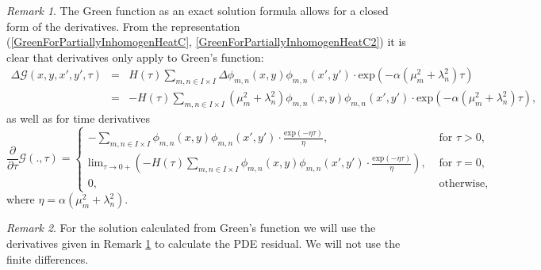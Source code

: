 \documentclass[a4paper,11pt]{article}
\theoremstyle{plain} %
\theoremstyle{definition} %
\theoremstyle{remark} %
\newtheorem{remark}{Remark}[section]
\theoremstyle{remark}
\def\Laplace{\Delta}
\def\Green{\mathscr{G}}
\begin{document}
\begin{remark} \label{Green_derivatives}
The Green function as an exact solution formula allows for a closed form of the derivatives. From the representation (\ref{GreenForPartiallyInhomogenHeatC}, \ref{GreenForPartiallyInhomogenHeatC2}) it is clear that derivatives only apply to Green's function:
\begin{eqnarray*}
\Laplace\Green (x,y,x',y',\tau ) & = & H(\tau ) \sum_{m,n \in I \times I } \Laplace \phi_{m,n} (x,y) \phi_{m,n} (x', y' ) \cdot \mathrm{exp} (-\alpha (\mu^2_m + \lambda^2_n) \tau ) \\
& = & - H(\tau ) \sum_{m,n \in I \times I } (\mu_m^2 + \lambda_n^2) \phi_{m,n} (x,y) \phi_{m,n} (x', y' ) \cdot \mathrm{exp} (-\alpha (\mu^2_m + \lambda^2_n) \tau ),
\end{eqnarray*}
as well as for time derivatives 
\begin{equation*}
\frac{\partial}{\partial \tau } \Green (.,\tau ) = 
\begin{cases}
- \sum\limits_{m,n \in I \times I } \phi_{m,n} (x,y) \phi_{m,n} (x', y' ) \cdot \frac{\mathrm{exp} (-\eta \tau )}{\eta }, & \text{ for } \tau > 0, \\
\mathrm{lim}_{\tau \rightarrow 0+ } \left( - H(\tau )\sum\limits_{m,n \in I \times I } \phi_{m,n} (x,y) \phi_{m,n} (x', y' ) \cdot \frac{\mathrm{exp} (- \eta\tau )}{\eta } \right) , & \text{ for } \tau = 0 ,\\
0, & \text{ otherwise, }
\end{cases}
\end{equation*}
where $ \eta = \alpha (\mu^2_m + \lambda^2_n) $.
\end{remark}
%
\begin{remark}
For the solution calculated from Green's function we will use the derivatives given in Remark \ref{Green_derivatives} to calculate the PDE residual. We will not use the finite differences.
\end{remark}
\end{document}
